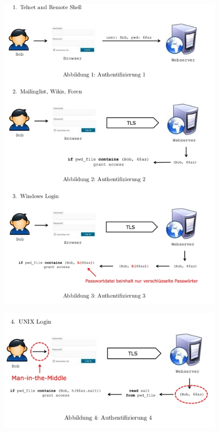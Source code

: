 \documentclass[a4paper, 11pt, nofootinbib]{article}
\begin{document}
\begin{figure}[htb]
	\centering
	\includegraphics[keepaspectratio=true,height=27\baselineskip]{authentification.jpg}
\end{figure}
\begin{figure}[htb]
	\centering
	\includegraphics[keepaspectratio=true,height=9\baselineskip]{authentification_2.jpg}
\end{figure}
\end{document}

